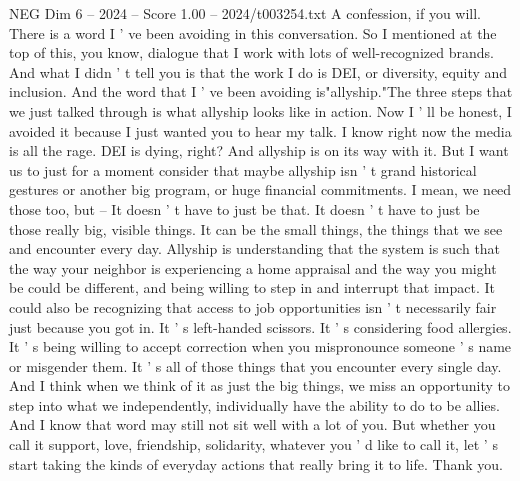 \begin{textsample}{NEG Dim 6 – 2024 – Score 1.00 – 2024/t003254.txt}
A confession, if you will.
There is a word I ' ve been avoiding in this conversation.
So I mentioned at the top of this, you know, dialogue that I work with lots of well-recognized brands.
And what I didn ' t tell you is that the work I do is DEI, or diversity, equity and inclusion.
And the word that I ' ve been avoiding is"allyship."The three steps that we just talked through is what allyship looks like in action.
Now I ' ll be honest, I avoided it because I just wanted you to hear my talk.
I know right now the media is all the rage.
DEI is dying, right?
And allyship is on its way with it.
But I want us to just for a moment consider that maybe allyship isn ' t grand historical gestures or another big program, or huge financial commitments.
I mean, we need those too, but -- It doesn ' t have to just be that.
It doesn ' t have to just be those really big, visible things.
It can be the small things, the things that we see and encounter every day.
Allyship is understanding that the system is such that the way your neighbor is experiencing a home appraisal and the way you might be could be different, and being willing to step in and interrupt that impact.
It could also be recognizing that access to job opportunities isn ' t necessarily fair just because you got in.
It ' s left-handed scissors.
It ' s considering food allergies.
It ' s being willing to accept correction when you mispronounce someone ' s name or misgender them.
It ' s all of those things that you encounter every single day.
And I think when we think of it as just the big things, we miss an opportunity to step into what we independently, individually have the ability to do to be allies.
And I know that word may still not sit well with a lot of you.
But whether you call it support, love, friendship, solidarity, whatever you ' d like to call it, let ' s start taking the kinds of everyday actions that really bring it to life.
Thank you.

\end{textsample}

